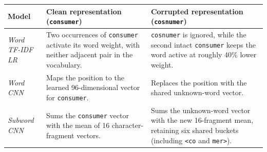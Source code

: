 \begin{tabularx}{\linewidth}{@{}>{\raggedright\arraybackslash}p{32mm}>{\raggedright\arraybackslash}X>{\raggedright\arraybackslash}X@{}}
\toprule
Model & Clean representation (\texttt{consumer}) & Corrupted representation (\texttt{cosnumer}) \\
\midrule
\textit{Word TF-IDF LR} & Two occurrences of \texttt{consumer} activate its word weight, with neither adjacent pair in the vocabulary. & \texttt{cosnumer} is ignored, while the second intact \texttt{consumer} keeps the word active at roughly 40\% lower weight. \\
\addlinespace
\textit{Word CNN} & Maps the position to the learned 96-dimensional vector for \texttt{consumer}. & Replaces the position with the shared unknown-word vector. \\
\addlinespace
\textit{Subword CNN} & Sums the \texttt{consumer} vector with the mean of 16 character-fragment vectors. & Sums the unknown-word vector with the new 16-fragment mean, retaining six shared buckets (including \texttt{<co} and \texttt{mer>}). \\
\bottomrule
\end{tabularx}
